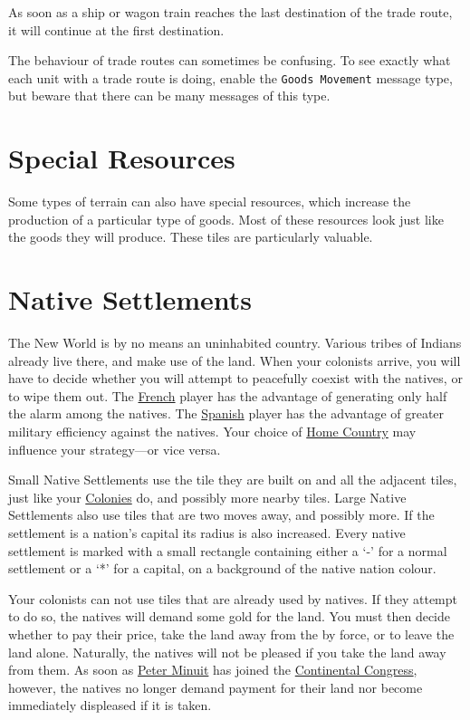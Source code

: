 \documentclass[12pt]{book}
\begin{document}
As soon as a ship or wagon train reaches the last destination of the
trade route, it will continue at the first destination.

The behaviour of trade routes can sometimes be confusing.  To see
exactly what each unit with a trade route is doing, enable the
\texttt{Goods Movement} message type, but beware that there can be
many messages of this type.

\hypertarget{Resources}{\section{Special Resources}}

Some types of terrain can also have special resources, which increase
the production of a particular type of goods. Most of these resources
look just like the goods they will produce. These tiles are
particularly valuable.


\hypertarget{Native Settlements}{\section{Native Settlements}}

The New World is by no means an uninhabited country. Various tribes of
Indians already live there, and make use of the land. When your
colonists arrive, you will have to decide whether you will attempt to
peacefully coexist with the natives, or to wipe them out. The
\hyperlink{France}{French} player has the advantage of generating only
half the alarm among the natives. The \hyperlink{Spain}{Spanish}
player has the advantage of greater military efficiency against the
natives. Your choice of \hyperlink{Home Country}{Home Country} may
influence your strategy---or vice versa.

Small Native Settlements use the tile they are built on and all the
adjacent tiles, just like your \hyperlink{Colonies}{Colonies} do, and
possibly more nearby tiles. Large Native Settlements also use tiles
that are two moves away, and possibly more. If the settlement is a
nation's capital its radius is also increased. Every native settlement
is marked with a small rectangle containing either a `-' for a normal
settlement or a `*' for a capital, on a background of the native
nation colour.

Your colonists can not use tiles that are already used by natives. If
they attempt to do so, the natives will demand some gold for the
land. You must then decide whether to pay their price, take the land
away from the by force, or to leave the land alone.  Naturally, the
natives will not be pleased if you take the land away from them. As
soon as \hyperlink{Peter Minuit}{Peter Minuit} has joined the
\hyperlink{Continental Congress}{Continental Congress}, however, the
natives no longer demand payment for their land nor become immediately
displeased if it is taken.
\end{document}
